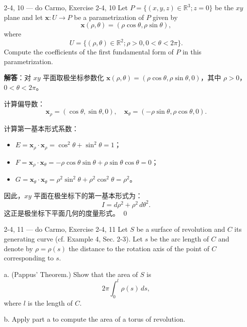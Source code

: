 \begin{exercise}{2-4, 10 — do Carmo, Exercise 2-4, 10}
Let $P = \{(x, y, z) \in \mathbb{R}^3; z = 0\}$ be the $xy$ plane and let $\mathbf{x}: U \to P$ be a parametrization of $P$ given by
\[
\mathbf{x}(\rho, \theta) = (\rho \cos \theta, \rho \sin \theta),
\]
where
\[
U = \{(\rho, \theta) \in \mathbb{R}^2; \rho > 0, 0 < \theta < 2\pi\}.
\]
Compute the coefficients of the first fundamental form of $P$ in this parametrization.
\end{exercise}

\begin{solution}
\textbf{解答}：对 $xy$ 平面取极坐标参数化 $\mathbf{x}(\rho, \theta) = (\rho\cos\theta, \rho\sin\theta, 0)$，其中 $\rho > 0$，$0 < \theta < 2\pi$。

计算偏导数：
\[
\mathbf{x}_\rho = (\cos\theta, \sin\theta, 0),\quad
\mathbf{x}_\theta = (-\rho\sin\theta, \rho\cos\theta, 0).
\]

计算第一基本形式系数：
\begin{itemize}
    \item $E = \mathbf{x}_\rho \cdot \mathbf{x}_\rho = \cos^2\theta + \sin^2\theta = 1$；
    \item $F = \mathbf{x}_\rho \cdot \mathbf{x}_\theta = -\rho\cos\theta\sin\theta + \rho\sin\theta\cos\theta = 0$；
    \item $G = \mathbf{x}_\theta \cdot \mathbf{x}_\theta = \rho^2\sin^2\theta + \rho^2\cos^2\theta = \rho^2$。
\end{itemize}

因此，$xy$ 平面在极坐标下的第一基本形式为：
\[
I = d\rho^2 + \rho^2\, d\theta^2.
\]
这正是极坐标下平面几何的度量形式。
\qed
\end{solution}

\begin{exercise}{2-4, 11 — do Carmo, Exercise 2-4, 11}
Let $S$ be a surface of revolution and $C$ its generating curve (cf. Example 4, Sec. 2-3). Let $s$ be the arc length of $C$ and denote by $\rho = \rho(s)$ the distance to the rotation axis of the point of $C$ corresponding to $s$.

a. (Pappus' Theorem.) Show that the area of $S$ is
\[
2\pi \int_0^l \rho(s) \, ds,
\]
where $l$ is the length of $C$.

b. Apply part a to compute the area of a torus of revolution.
\end{exercise}

